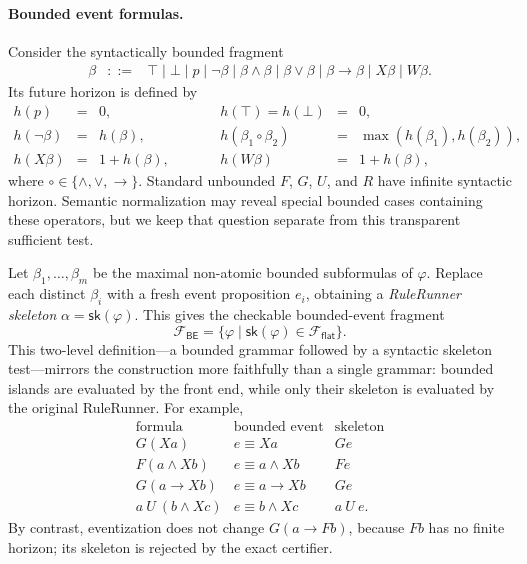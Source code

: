 \paragraph{Bounded event formulas.}
Consider the syntactically bounded fragment
\[
\begin{array}{rcl}
\beta &::=& \top \mid \bot \mid p \mid \neg\beta
 \mid \beta\land\beta \mid \beta\lor\beta \mid \beta\to\beta
 \mid X\beta \mid W\beta .
\end{array}
\]
Its future horizon is defined by
\[
\begin{array}{rclcrcl}
h(p)&=&0,
&\qquad&h(\top)=h(\bot)&=&0,\\
h(\neg\beta)&=&h(\beta),
&&h(\beta_1\circ\beta_2)&=&\max(h(\beta_1),h(\beta_2)),\\
 h(X\beta)&=&1+h(\beta),
&&h(W\beta)&=&1+h(\beta),
\end{array}
\]
where $\circ\in\{\land,\lor,\to\}$.  Standard unbounded $F$, $G$, $U$, and
$R$ have infinite syntactic horizon.  Semantic normalization may reveal
special bounded cases containing these operators, but we keep that question
separate from this transparent sufficient test.

Let $\beta_1,\ldots,\beta_m$ be the maximal non-atomic bounded subformulas of
$\varphi$.  Replace each distinct $\beta_i$ with a fresh event proposition
$e_i$, obtaining a \emph{RuleRunner skeleton}
$\alpha=\mathsf{sk}(\varphi)$.  This gives the checkable bounded-event
fragment
\[
    \mathcal F_{\mathsf{BE}}
    = \{\varphi \mid
         \mathsf{sk}(\varphi)\in\mathcal F_{\mathsf{flat}}\}.
\]
This two-level definition---a bounded grammar followed by a syntactic skeleton
test---mirrors the construction more faithfully than a single grammar: bounded
islands are evaluated by the front end, while only their skeleton is evaluated
by the original RuleRunner.  For example,
\[
\begin{array}{c|c|c}
\text{formula} & \text{bounded event} & \text{skeleton}\\ \hline
G(Xa) & e\equiv Xa & Ge\\
F(a\land Xb) & e\equiv a\land Xb & Fe\\
G(a\to Xb) & e\equiv a\to Xb & Ge\\
a\ U\ (b\land Xc) & e\equiv b\land Xc & a\ U\ e.
\end{array}
\]
By contrast, eventization does not change $G(a\to Fb)$, because $Fb$ has no
finite horizon; its skeleton is rejected by the exact certifier.

